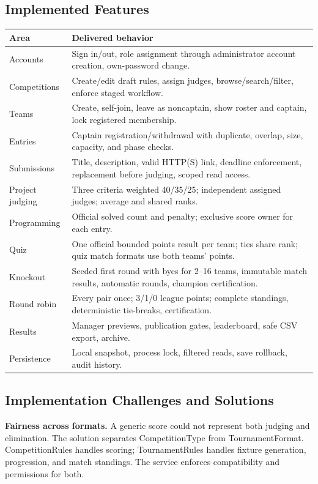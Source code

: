 \documentclass[12pt]{article}
\begin{document}
\subsection{Implemented Features}
\begin{tabularx}{\linewidth}{lY}\toprule Area & Delivered behavior\\\midrule
Accounts & Sign in/out, role assignment through administrator account creation, own-password change.\\
Competitions & Create/edit draft rules, assign judges, browse/search/filter, enforce staged workflow.\\
Teams & Create, self-join, leave as noncaptain, show roster and captain, lock registered membership.\\
Entries & Captain registration/withdrawal with duplicate, overlap, size, capacity, and phase checks.\\
Submissions & Title, description, valid HTTP(S) link, deadline enforcement, replacement before judging, scoped read access.\\
Project judging & Three criteria weighted 40/35/25; independent assigned judges; average and shared ranks.\\
Programming & Official solved count and penalty; exclusive score owner for each entry.\\
Quiz & One official bounded points result per team; ties share rank; quiz match formats use both teams' points.\\
Knockout & Seeded first round with byes for 2--16 teams, immutable match results, automatic rounds, champion certification.\\
Round robin & Every pair once; 3/1/0 league points; complete standings, deterministic tie-breaks, certification.\\
Results & Manager previews, publication gates, leaderboard, safe CSV export, archive.\\
Persistence & Local snapshot, process lock, filtered reads, save rollback, audit history.\\\bottomrule\end{tabularx}
\subsection{Implementation Challenges and Solutions}
\textbf{Fairness across formats.} A generic score could not represent both judging and elimination. The solution separates CompetitionType from TournamentFormat. CompetitionRules handles scoring; TournamentRules handles fixture generation, progression, and match standings. The service enforces compatibility and permissions for both.
\end{document}
